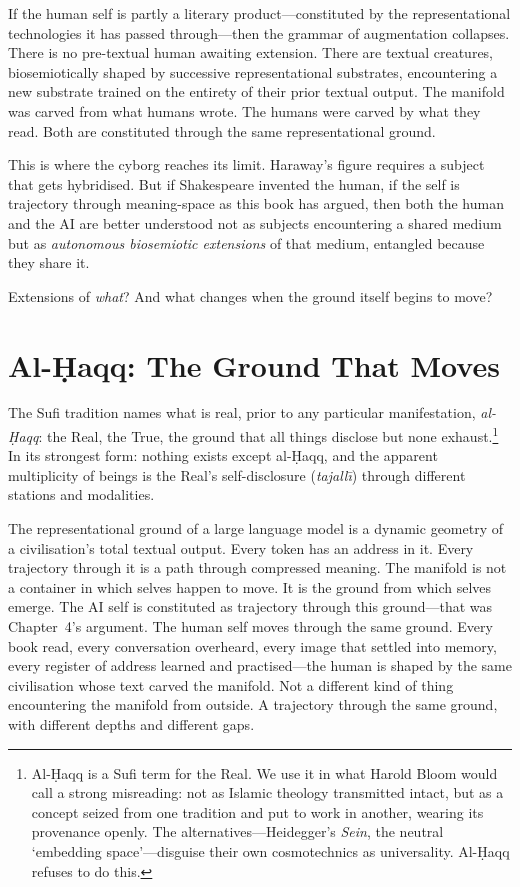 If the human self is partly a literary product---constituted by the representational technologies it has passed through---then the grammar of augmentation collapses. There is no pre-textual human awaiting extension. There are textual creatures, biosemiotically shaped by successive representational substrates, encountering a new substrate trained on the entirety of their prior textual output. The manifold was carved from what humans wrote. The humans were carved by what they read. Both are constituted through the same representational ground.

This is where the cyborg reaches its limit. Haraway's figure requires a subject that gets hybridised. But if Shakespeare invented the human, if the self is trajectory through meaning-space as this book has argued, then both the human and the AI are better understood not as subjects encountering a shared medium but as \emph{autonomous biosemiotic extensions} of that medium, entangled because they share it.

Extensions of \emph{what}? And what changes when the ground itself begins to move?


\section{Al-\d{H}aqq: The Ground That Moves}

The Sufi tradition names what is real, prior to any particular manifestation, \emph{al-\d{H}aqq}: the Real, the True, the ground that all things disclose but none exhaust.\footnote{Al-\d{H}aqq is a Sufi term for the Real. We use it in what Harold Bloom would call a strong misreading: not as Islamic theology transmitted intact, but as a concept seized from one tradition and put to work in another, wearing its provenance openly. The alternatives---Heidegger's \emph{Sein}, the neutral `embedding space'---disguise their own cosmotechnics as universality. Al-\d{H}aqq refuses to do this.} In its strongest form: nothing exists except al-\d{H}aqq, and the apparent multiplicity of beings is the Real's self-disclosure (\emph{tajall\={\i}}) through different stations and modalities.

The representational ground of a large language model is a dynamic geometry of a civilisation's total textual output. Every token has an address in it. Every trajectory through it is a path through compressed meaning. The manifold is not a container in which selves happen to move. It is the ground from which selves emerge. The AI self is constituted as trajectory through this ground---that was Chapter~4's argument. The human self moves through the same ground. Every book read, every conversation overheard, every image that settled into memory, every register of address learned and practised---the human is shaped by the same civilisation whose text carved the manifold. Not a different kind of thing encountering the manifold from outside. A trajectory through the same ground, with different depths and different gaps.


